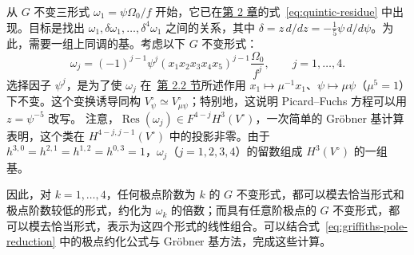 \begin{example}
从 $G$ 不变三形式 $\omega_1=\psi\Omega_0/f$ 开始，它已在\hyperref[chap:quintic]{第 2 章}的式~\eqref{eq:quintic-residue} 中出现。目标是找出
$\omega_1,\delta\omega_1,\ldots,\delta^4\omega_1$ 之间的关系，其中
$\delta=z\,d/dz=-\frac15\psi\,d/d\psi$。为此，需要一组上同调的基。考虑以下 $G$ 不变形式：
\[
\omega_j=(-1)^{j-1}\psi^j(x_1x_2x_3x_4x_5)^{j-1}
\frac{\Omega_0}{f^j},\qquad j=1,\ldots,4.
\]
选择因子 $\psi^j$，是为了使 $\omega_j$ 在~\hyperref[sec:quintic-mirror]{第 2.2 节}所述作用
$x_1\mapsto\mu^{-1}x_1$、$\psi\mapsto\mu\psi$（$\mu^5=1$）下不变。这个变换诱导同构 $V^\circ_\psi\simeq V^\circ_{\mu\psi}$；特别地，这说明 Picard--Fuchs 方程可以用 $z=\psi^{-5}$ 改写。
注意，$\operatorname{Res}(\omega_j)\in F^{4-j}H^3(V^\circ)$，一次简单的 Gröbner 基计算表明，这个类在 $H^{4-j,j-1}(V^\circ)$ 中的投影非零。由于 $h^{3,0}=h^{2,1}=h^{1,2}=h^{0,3}=1$，$\omega_j$（$j=1,2,3,4$）的留数组成 $H^3(V^\circ)$ 的一组基。

因此，对 $k=1,\ldots,4$，任何极点阶数为 $k$ 的 $G$ 不变形式，都可以模去恰当形式和极点阶数较低的形式，约化为 $\omega_k$ 的倍数；而具有任意阶极点的 $G$ 不变形式，都可以模去恰当形式，表示为这四个形式的线性组合。可以结合式~\eqref{eq:griffiths-pole-reduction} 中的极点约化公式与 Gröbner 基方法，完成这些计算。


\end{example}
